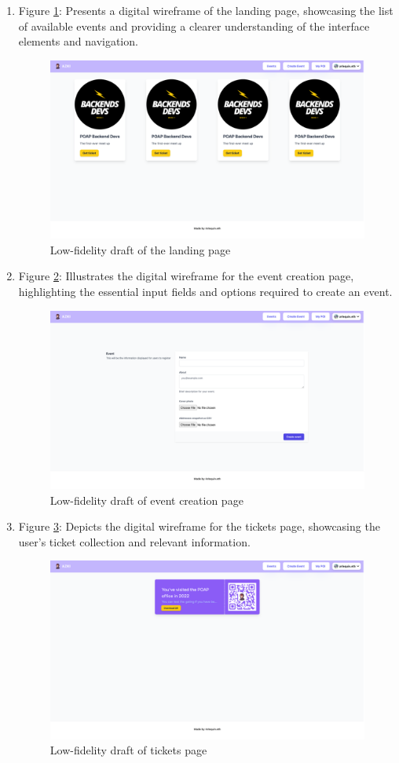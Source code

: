 \begin{enumerate}
\item Figure \ref{Abb7}: Presents a digital wireframe of the landing page, showcasing the list of available events and providing a clearer understanding of the interface elements and navigation. \
\begin{figure}[H]
\centering
\includegraphics[width=0.5\linewidth]{PICs/LowFiLanding.png}
\caption{Low-fidelity draft of the landing page}\label{Abb7}
\end{figure}

\item Figure \ref{Abb8}: Illustrates the digital wireframe for the event creation page, highlighting the essential input fields and options required to create an event.\\
\begin{figure}[H]
\centering
\includegraphics[width=0.5\linewidth]{PICs/LowFiCreate.png}
\caption{Low-fidelity draft of event creation page}\label{Abb8}
\end{figure}

\item Figure \ref{Abb9}: Depicts the digital wireframe for the tickets page, showcasing the user's ticket collection and relevant information.\\
\begin{figure}[H]
\centering
\includegraphics[width=0.5\linewidth]{PICs/LowFiTicket.png}
\caption{Low-fidelity draft of tickets page}\label{Abb9}
\end{figure}


\end{enumerate}
